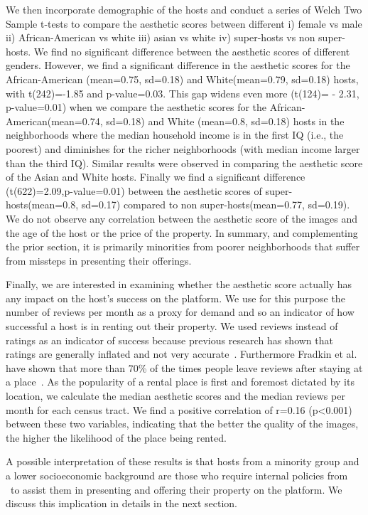 We then incorporate demographic of the hosts and conduct a series of  Welch Two Sample  t-tests  to compare the aesthetic scores between different i) female vs male ii) African-American vs white iii) asian vs white iv) super-hosts vs non super-hosts. We find no significant difference between the aesthetic scores of different genders. However, we find a significant difference in the aesthetic scores for the African-American (mean=0.75, sd=0.18) and White(mean=0.79, sd=0.18) hosts, with t(242)=-1.85 and p-value=0.03.  This gap widens even more (t(124)= - 2.31, p-value=0.01) when we compare the aesthetic scores for the African-American(mean=0.74, sd=0.18) and White (mean=0.8, sd=0.18) hosts in the neighborhoods where the median household income is in the first IQ (i.e., the poorest) and diminishes for the richer neighborhoods (with median income larger than the third IQ). Similar results were observed in comparing the aesthetic score of the Asian and White hosts.   Finally we find a significant difference (t(622)=2.09,p-value=0.01) between the aesthetic scores of super-hosts(mean=0.8, sd=0.17) compared to non super-hosts(mean=0.77, sd=0.19). We  do not observe any correlation between the aesthetic score of the images and the age of the host or the price of the property.  In summary, and complementing the prior section, it is primarily minorities from poorer neighborhoods that suffer from missteps in presenting their offerings.


Finally, we are interested in examining whether the aesthetic score actually has any impact on the host's success on the platform.
We use for this purpose the number of reviews per month as a proxy for demand and so an indicator of how successful a host is in renting out their property. We used reviews instead of ratings as an indicator of success because previous research has shown that  ratings are generally inflated and not very accurate~\cite{zervas2015first}. Furthermore Fradkin et al. have shown that more than  70\% of the times  people leave reviews after staying at a place~\cite{fradkin2015bias}.  As the popularity of a rental place is first and foremost dictated by its location, we calculate the median aesthetic scores and the median reviews per month for each census tract. We find a positive correlation of r=0.16 (p<0.001) between these two variables, indicating that the better the quality of the images, the higher the likelihood of the place being rented.   

A possible interpretation of these results is that hosts from a minority group and a lower socioeconomic background are those who require internal policies from \ab \ to assist them in presenting and offering their property on the platform. We discuss this implication in details in the next section.  


